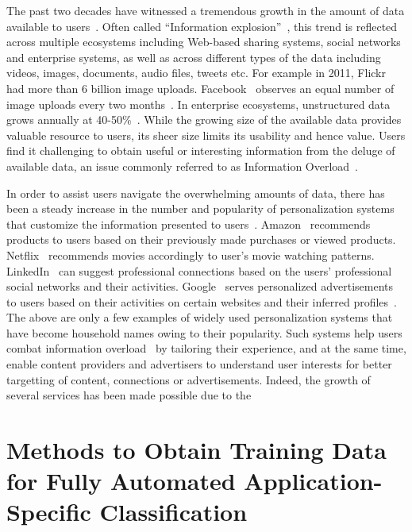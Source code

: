 \documentclass[12pt]{ucsddissertation}
\begin{document}
\begin{dissertationintroduction}


The past two decades have witnessed a tremendous growth in the amount of data available to users~\cite{edmunds2000problem,ShuhuiAuthor15,IDCDataGrowth,Neilson2011}. Often called ``Information explosion''~\cite{van2002information}, this trend is reflected across multiple ecosystems including Web-based sharing systems, social networks and enterprise systems, as well as across different types of the data including videos, images, documents, audio files, tweets etc. For example in 2011, Flickr~\cite{Flickr6B} had more than 6 billion image uploads. Facebook~\cite{Facebook} observes an equal number of image uploads every two months~\cite{beaver2010finding}. In enterprise ecosystems, unstructured data grows annually at 40-50\%~\cite{IDCDataGrowth}. While the growing size of the available data provides valuable resource to users, its sheer size limits its usability and hence value. Users find it challenging to obtain useful or interesting information from the deluge of available data, an issue commonly referred to as Information Overload~\cite{}\cite{}. 


In order to assist users navigate the overwhelming amounts of data, there has been a steady increase in the number and popularity of personalization systems that customize the information presented to users~\cite{NEEDED}.
Amazon~\cite{} recommends products to users based on their previously made purchases or viewed products. Netflix~\cite{} recommends movies accordingly to user's movie watching patterns. LinkedIn~\cite{} can suggest professional connections based on the users' professional social networks and their activities. Google~\cite{} serves personalized advertisements to users based on their activities on certain websites and their inferred profiles~\cite{}. The above are only a few examples of widely used personalization systems that have become household names owing to their popularity. Such systems help users combat information overload~\cite{} by tailoring their experience, and at the same time, enable content providers and advertisers to understand user interests for better targetting of content, connections or advertisements. Indeed, the growth of several services has been made possible due to the 



\end{dissertationintroduction}

\chapter{Methods to Obtain Training Data for Fully Automated Application-Specific Classification}

\end{document}
